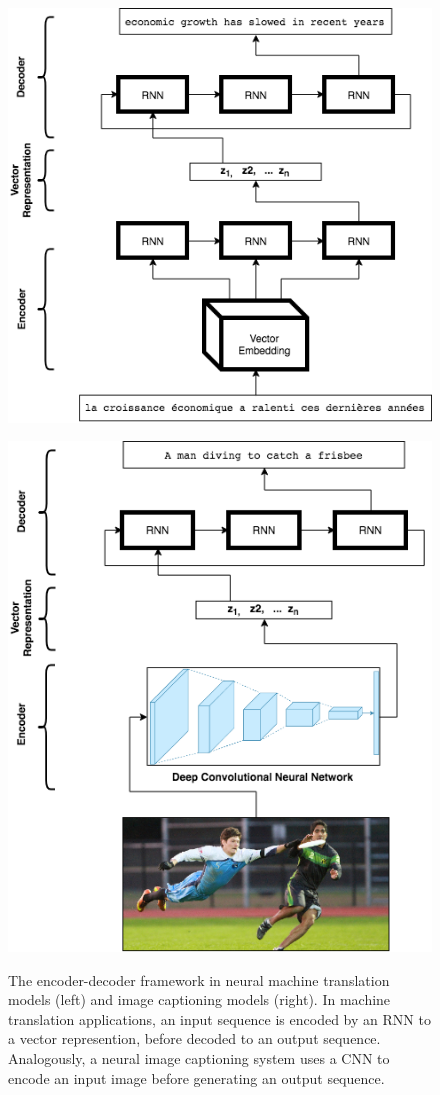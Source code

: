 \documentclass[letterpaper, 10 pt, conference]{ieeeconf}
\begin{document}
\begin{figure}[ht]
\centering
\begin{minipage}{.5\textwidth}
  \centering
  \includegraphics[width=.65\linewidth]{encoder_decoder_trans}
  \label{fig:test1}
\end{minipage}%
\begin{minipage}{.5\textwidth}
  \centering
  \includegraphics[width=.65\linewidth]{encoder_decoder_cnn}
  \label{fig:test2}
\end{minipage}
\caption{The encoder-decoder framework in neural machine translation models (left) and image captioning models (right). In machine translation applications, an input sequence is encoded by an RNN to a vector represention, before decoded to an output sequence. Analogously, a neural image captioning system uses a CNN to encode an input image before generating an output sequence.}
\end{figure}
\end{document}
